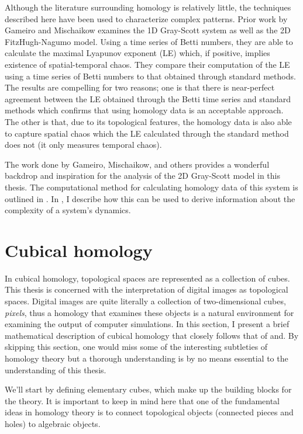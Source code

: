 Although the literature surrounding homology is relatively little, the techniques described here have been used to characterize complex patterns. Prior work by Gameiro and Mischaikow examines the 1D Gray-Scott system as well as the 2D FitzHugh-Nagumo model. Using a time series of Betti numbers, they are able to calculate the maximal Lyapunov exponent (LE) which, if positive, implies existence of spatial-temporal chaos. They compare their computation of the LE using a time series of Betti numbers to that obtained through standard methods. The results are compelling for two reasons; one is that there is near-perfect agreement between the LE obtained through the Betti time series and standard methods which confirms that using homology data is an acceptable approach. The other is that, due to its topological features, the homology data is also able to capture spatial chaos which the LE calculated through the standard method does not (it only measures temporal chaos).

The work done by Gameiro, Mischaikow, and others provides a wonderful backdrop and inspiration for the analysis of the 2D Gray-Scott model in this thesis. The computational method for calculating homology data of this system is outlined in . In , I describe how this can be used to derive information about the complexity of a system's dynamics.

\section{Cubical homology} \label{ch2:cubicalhomology}

In cubical homology, topological spaces are represented as a collection of cubes. This thesis is concerned with the interpretation of digital images as topological spaces. Digital images are quite literally a collection of two-dimensional cubes, \textit{pixels}, thus a homology that examines these objects is a natural environment for examining the output of computer simulations. In this section, I present a brief mathematical description of cubical homology that closely follows that of and. By skipping this section, one would miss some of the interesting subtleties of homology theory but a thorough understanding is by no means essential to the understanding of this thesis.

We'll start by defining elementary cubes, which make up the building blocks for the theory. It is important to keep in mind here that one of the fundamental ideas in homology theory is to connect topological objects (\eg connected pieces and holes) to algebraic objects.

